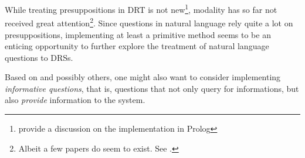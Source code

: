 \documentclass{article}
\begin{document}
While treating presuppositions in DRT is not new\footnote{\citet[Chap.
4]{blackburnbos:cl2} provide a discussion on the implementation in Prolog},
modality has so far not received great attention\footnote{Albeit a few papers do
seem to exist. See \citet{frank96context}.}. Since questions in natural language
rely quite a lot on presuppositions, implementing at least a primitive method
seems to be an enticing opportunity to further explore the treatment of natural
language questions to DRSs.

Based on \citet{jaeger:1997} and possibly others, one might also want to
consider implementing \emph{informative questions}, that is, questions that not
only query for informations, but also \emph{provide} information to the system.


\end{document}
